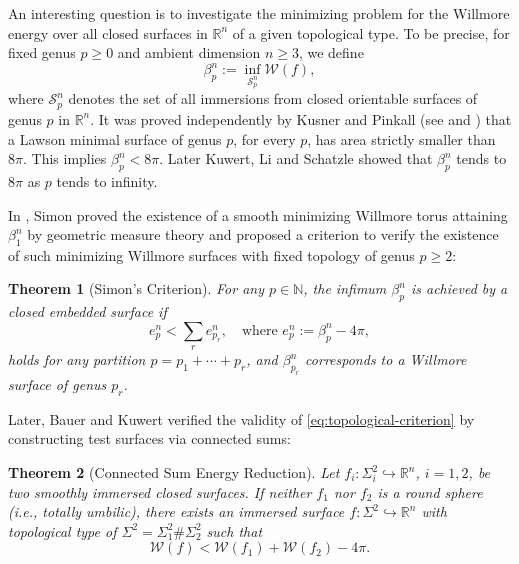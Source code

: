 \documentclass[11pt,letterpaper]{amsart}
\newtheorem{theorem}{Theorem}[section]
\theoremstyle{definition}
\theoremstyle{remark}
\numberwithin{equation}{section}
\begin{document}
An interesting question is to investigate the minimizing problem for the Willmore
energy over all closed surfaces in $\mathbb{R}^n$ of a given topological type.
To be precise, for fixed genus \( p \geq 0 \) and ambient dimension \( n \geq 3 \), we define
\begin{equation*}
    \beta^n_p := \inf_{\mathcal{S}^n_p} \mathcal{W}(f),
\end{equation*}
where \( \mathcal{S}^n_p \) denotes the set of all immersions from closed orientable surfaces of genus \( p \) in $\mathbb{R}^n$. 
It was proved independently by Kusner and Pinkall (see \cite{kuhnel1986total} and \cite{Kusner}) that a Lawson minimal surface of genus $p$, for every $p$, has area strictly smaller than $8\pi$. This implies $\beta_{p}^n < 8\pi$. Later Kuwert, Li and Schatzle \cite{Kuwert2010TheLG} showed that $\beta^n_p$ tends to $8\pi$ as $p$ tends
to infinity.

In \cite{Simon93}, Simon proved the existence of a smooth minimizing Willmore torus attaining $\beta^n_1$ by geometric measure theory and proposed a criterion to verify the existence of such minimizing  Willmore surfaces with fixed topology of genus $p\geq 2$:
\begin{theorem}[Simon's Criterion]
    For any \( p \in \mathbb{N} \), the infimum \( \beta^n_p \) is achieved by a closed embedded surface if
    \begin{equation}\label{eq:topological-criterion}
        e^n_p < \sum_{r} e^n_{p_r}, \quad \text{where } e^n_p := \beta^n_p - 4\pi,
    \end{equation}
    holds for any partition \( p = p_1 + \cdots + p_r \), and \( \beta^n_{p_r} \) corresponds to a Willmore surface of genus \( p_r \).
\end{theorem}

Later, Bauer and Kuwert\cite[Theorem 1.3]{Bauer-Kuwert03} verified the validity of \eqref{eq:topological-criterion} by constructing test surfaces via connected sums:
\begin{theorem}[Connected Sum Energy Reduction]
    Let \( f_i \colon \Sigma_i^2 \hookrightarrow \mathbb{R}^n \), \( i = 1, 2 \), be two smoothly immersed closed surfaces. If neither \( f_1 \) nor \( f_2 \) is a round sphere (i.e., totally umbilic), there exists an immersed surface \( f \colon \Sigma^2 \hookrightarrow \mathbb{R}^n \) with topological type of \( \Sigma^2 = \Sigma_1^2 \# \Sigma_2^2 \) such that
    \begin{equation}\label{Connected-Sum-Energy-Reduction-2}
        \mathcal{W}(f) < \mathcal{W}(f_1) + \mathcal{W}(f_2) - 4\pi.
    \end{equation}
\end{theorem}
\end{document}
